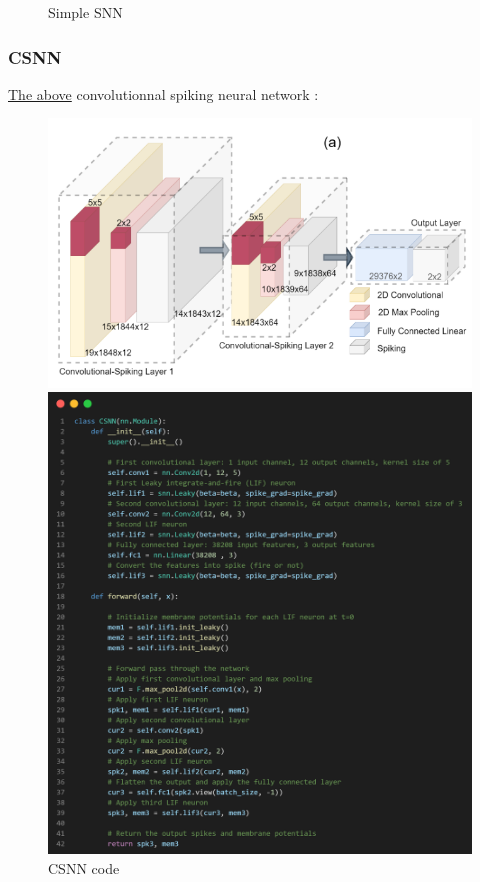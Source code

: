 \documentclass[11pt]{article}
\begin{document}
\begin{figure}[H]
\begin{minipage}{0.5\textwidth}
    \caption{Simple SNN}
    \label{fig:simple_snn_code}
  \end{minipage}
\end{figure}

\subsubsection*{CSNN}

\hyperref[fig:csnn_template]{The above} convolutionnal spiking neural network :

\begin{figure}[H]
  \begin{minipage}{0.4\textwidth}
    \centering
    \includegraphics[width=0.9\linewidth]{image/csnn_template_model.png}
  \end{minipage}
  \begin{minipage}{0.6\textwidth}
    \centering
    \includegraphics[width=\textwidth]{./image/csnn_code.png}    \caption{CSNN code}
    \label{fig:csnn_code}
    
  \end{minipage}
\end{figure}
\end{document}

